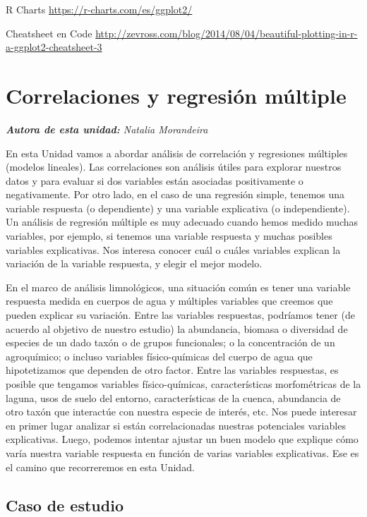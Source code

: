 \documentclass[
]{book}
\begin{document}
R Charts \url{https://r-charts.com/es/ggplot2/}

Cheatsheet en Code \url{http://zevross.com/blog/2014/08/04/beautiful-plotting-in-r-a-ggplot2-cheatsheet-3}

\hypertarget{regmul}{%
\chapter{Correlaciones y regresión múltiple}\label{regmul}}

\emph{\textbf{Autora de esta unidad:} Natalia Morandeira}

En esta Unidad vamos a abordar análisis de correlación y regresiones múltiples (modelos lineales). Las correlaciones son análisis útiles para explorar nuestros datos y para evaluar si dos variables están asociadas positivamente o negativamente. Por otro lado, en el caso de una regresión simple, tenemos una variable respuesta (o dependiente) y una variable explicativa (o independiente). Un análisis de regresión múltiple es muy adecuado cuando hemos medido muchas variables, por ejemplo, si tenemos una variable respuesta y muchas posibles variables explicativas. Nos interesa conocer cuál o cuáles variables explican la variación de la variable respuesta, y elegir el mejor modelo.

En el marco de análisis limnológicos, una situación común es tener una variable respuesta medida en cuerpos de agua y múltiples variables que creemos que pueden explicar su variación. Entre las variables respuestas, podríamos tener (de acuerdo al objetivo de nuestro estudio) la abundancia, biomasa o diversidad de especies de un dado taxón o de grupos funcionales; o la concentración de un agroquímico; o incluso variables físico-químicas del cuerpo de agua que hipotetizamos que dependen de otro factor. Entre las variables respuestas, es posible que tengamos variables físico-químicas, características morfométricas de la laguna, usos de suelo del entorno, características de la cuenca, abundancia de otro taxón que interactúe con nuestra especie de interés, etc. Nos puede interesar en primer lugar analizar si están correlacionadas nuestras potenciales variables explicativas. Luego, podemos intentar ajustar un buen modelo que explique cómo varía nuestra variable respuesta en función de varias variables explicativas. Ese es el camino que recorreremos en esta Unidad.

\hypertarget{caso-de-estudio}{%
\section{Caso de estudio}\label{caso-de-estudio}}
\end{document}
